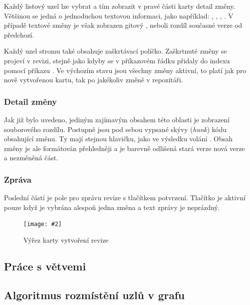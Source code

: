 \documentclass[
  biblatex,
  glossaries,
  index
]{kidiplom}
\newcommand{\pic}[4]{
\begin{figure}[h]
\centering
\texttt{[image: \#2]}
\caption{#3}
\label{fig:#4}
\end{figure}}
\begin{document}
Každý listový uzel lze vybrat a tím zobrazit v pravé části karty detail změny. Většinou se jedná o jednoduchou textovou informaci, jako například: , , , . V případě textové změny je však zobrazen gitový , neboli rozdíl současné verze od předchozí.

Každý uzel stromu také obsahuje zaškrtávací políčko. Zaškrtnuté změny se projeví v revizi, stejně jako kdyby se v příkazovém řádku přidaly do indexu pomocí příkazu . Ve výchozím stavu jsou všechny změny aktivní, to platí jak pro nově vytvořenou kartu, tak po jakékoliv změně v repozitáři.

\subsubsection{Detail změny}
Jak již bylo uvedeno, jediným zajímavým obsahem této oblasti je zobrazení souborového rozdílu. Postupně jsou pod sebou vypsané skývy ({\it hunk}) kódu obsahující změnu. Ty mají stejnou hlavičku, jako ve výsledku volání . Obsah změny je ale formátován přehledněji a je barevně odlišená stará verze nová verze a nezměněná část.

\subsubsection{Zpráva}
Poslední částí je pole pro zprávu revize s tlačítkem potvrzení. Tlačítko je aktivní pouze když je vybrána alespoň jedna změna a text zprávy je neprázdný.

\pic{10cm}{create-commit.png}{Výřez karty vytvoření revize}{}

\subsection{Práce s větvemi}

 



 




\subsection{Algoritmus rozmístění uzlů v grafu}
\label{subsec:algorithm}
\end{document}
